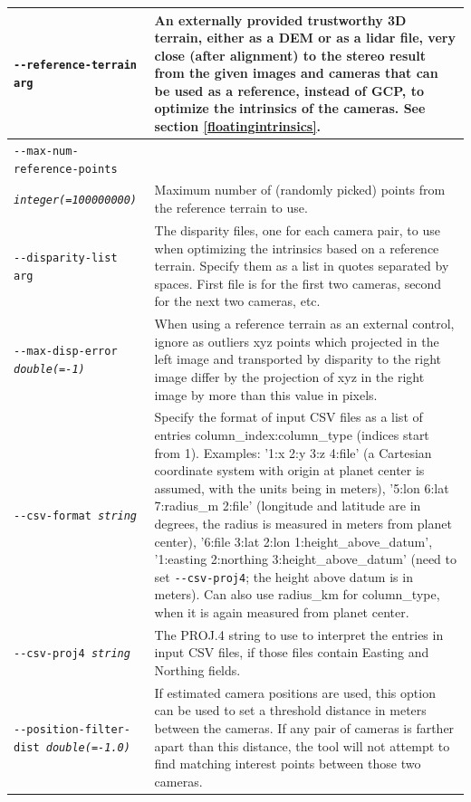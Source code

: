\begin{longtable}{|l|p{8.0cm}|}
\texttt{-\/-reference-terrain arg} & An externally provided trustworthy 3D terrain, either as a DEM or as a lidar file, very close (after alignment) to the stereo result from the given images and cameras that can be used as a reference, instead of GCP, to optimize the intrinsics of the cameras. See section \ref{floatingintrinsics}. \\ \hline

\texttt{-\/-max-num-reference-points} \\
\texttt{\textit{integer(=100000000)}}   & Maximum number of (randomly picked) points from the reference terrain to use.\\ \hline

\texttt{-\/-disparity-list arg} & The disparity files, one for each camera pair, to use when optimizing the intrinsics based on a reference terrain. Specify them as a list in quotes separated by spaces. First file is for the first two cameras, second for the next two cameras, etc. \\ \hline

\texttt{-\/-max-disp-error \textit{double(=-1)}} & When using a reference terrain as an external control, ignore as outliers xyz points which projected in the left image and transported by disparity to the right image differ by the projection of xyz in the right image by more than this value in pixels.\\ \hline

\texttt{-\/-csv-format \textit{string}} & Specify the format of input
CSV files as a list of entries column\_index:column\_type (indices start
from 1). Examples: '1:x 2:y 3:z 4:file' (a Cartesian coordinate system with
origin at planet center is assumed, with the units being in meters),
'5:lon 6:lat 7:radius\_m 2:file' (longitude and latitude are in degrees, the
radius is measured in meters from planet center), '6:file 3:lat 2:lon
1:height\_above\_datum', '1:easting 2:northing 3:height\_above\_datum'
(need to set \texttt{-\/-csv-proj4}; the height above datum is in
meters). Can also use radius\_km for column\_type, when it is again
measured from planet center.\\ \hline

\texttt{-\/-csv-proj4 \textit{string}} & The PROJ.4 string to use to
interpret the entries in input CSV files, if those files contain Easting
and Northing fields. \\ \hline

\texttt{-\/-position-filter-dist \textit{double(=-1.0)}} &
If estimated camera positions are used, this option can be used to set a threshold distance in meters
between the cameras.  If any pair of cameras is farther apart than this distance, the tool will not
attempt to find matching interest points between those two cameras.
\\ \hline


\end{longtable}
